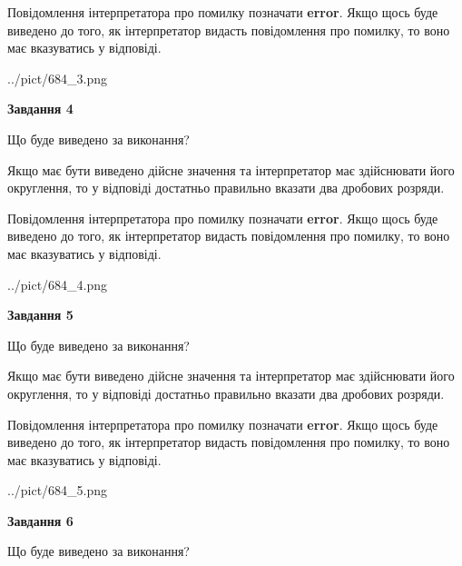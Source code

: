 \documentclass[12pt, ukrainian]{article}
\begin{document}
{\begin {Large}
Повідомлення інтерпретатора про помилку позначати \textbf{error}.
Якщо щось буде виведено до того, як інтерпретатор видасть повідомлення про помилку, 
то воно має вказуватись у відповіді. \par

\begin{center}
	{../pict/684_3.png}
\end{center}
\newpage

{\begin {center}\textbf{Завдання 4}\end {center}}\par
Що буде виведено за виконання? \par

Якщо має бути виведено дійсне значення та інтерпретатор має здійснювати його округлення, 
то у відповіді достатньо правильно вказати два дробових розряди.

Повідомлення інтерпретатора про помилку позначати \textbf{error}.
Якщо щось буде виведено до того, як інтерпретатор видасть повідомлення про помилку, 
то воно має вказуватись у відповіді. \par

\begin{center}
	{../pict/684_4.png}
\end{center}
\newpage

{\begin {center}\textbf{Завдання 5}\end {center}}\par
Що буде виведено за виконання? \par

Якщо має бути виведено дійсне значення та інтерпретатор має здійснювати його округлення, 
то у відповіді достатньо правильно вказати два дробових розряди.

Повідомлення інтерпретатора про помилку позначати \textbf{error}.
Якщо щось буде виведено до того, як інтерпретатор видасть повідомлення про помилку, 
то воно має вказуватись у відповіді. \par

\begin{center}
	{../pict/684_5.png}
\end{center}
\newpage

{\begin {center}\textbf{Завдання 6}\end {center}}\par
Що буде виведено за виконання? \par


\end{Large}}
\end{document}

